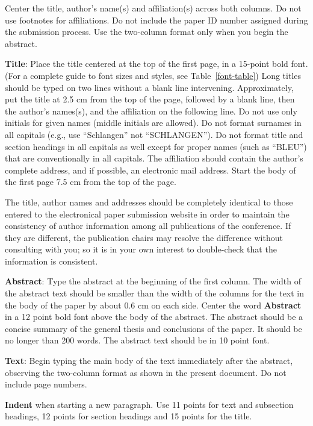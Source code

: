 \documentclass[11pt]{article}
\begin{document}
Center the title, author's name(s) and affiliation(s) across both
columns. Do not use footnotes for affiliations. Do not include the
paper ID number assigned during the submission process. Use the
two-column format only when you begin the abstract.

{\bf Title}: Place the title centered at the top of the first page, in
a 15-point bold font. (For a complete guide to font sizes and styles,
see Table~\ref{font-table}) Long titles should be typed on two lines
without a blank line intervening. Approximately, put the title at 2.5
cm from the top of the page, followed by a blank line, then the
author's names(s), and the affiliation on the following line. Do not
use only initials for given names (middle initials are allowed). Do
not format surnames in all capitals (e.g., use ``Schlangen'' not
``SCHLANGEN'').  Do not format title and section headings in all
capitals as well except for proper names (such as ``BLEU'') that are
conventionally in all capitals.  The affiliation should contain the
author's complete address, and if possible, an electronic mail
address. Start the body of the first page 7.5 cm from the top of the
page.

The title, author names and addresses should be completely identical
to those entered to the electronical paper submission website in order
to maintain the consistency of author information among all
publications of the conference. If they are different, the publication
chairs may resolve the difference without consulting with you; so it
is in your own interest to double-check that the information is
consistent.

{\bf Abstract}: Type the abstract at the beginning of the first
column. The width of the abstract text should be smaller than the
width of the columns for the text in the body of the paper by about
0.6 cm on each side. Center the word {\bf Abstract} in a 12 point bold
font above the body of the abstract. The abstract should be a concise
summary of the general thesis and conclusions of the paper. It should
be no longer than 200 words. The abstract text should be in 10 point font.

{\bf Text}: Begin typing the main body of the text immediately after
the abstract, observing the two-column format as shown in 
the present document. Do not include page numbers.

{\bf Indent} when starting a new paragraph. Use 11 points for text and 
subsection headings, 12 points for section headings and 15 points for
the title. 
\end{document}
